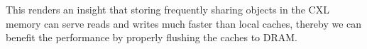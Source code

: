 


\hspace*{\fill}

\noindent{}

\ifx\nocmt\undefined
This renders an insight that storing frequently sharing objects in the CXL memory can serve reads and writes much faster than local caches, thereby we can benefit the performance by properly flushing the caches to DRAM. 
\fi




